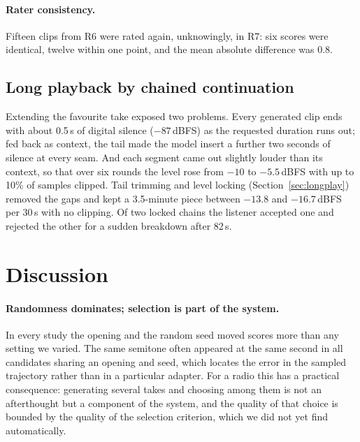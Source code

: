 \paragraph{Rater consistency.} Fifteen clips from R6 were rated again, unknowingly, in R7: six scores were identical,
twelve within one point, and the mean absolute difference was 0.8.

\subsection{Long playback by chained continuation}\label{sec:chain}
Extending the favourite take exposed two problems. Every generated clip ends with about 0.5\,s of digital silence
($-87$\,dBFS) as the requested duration runs out; fed back as context, the tail made the model insert a further two
seconds of silence at every seam. And each segment came out slightly louder than its context, so that over six
rounds the level rose from $-10$ to $-5.5$\,dBFS with up to 10\% of samples clipped. Tail trimming and level locking
(Section~\ref{sec:longplay}) removed the gaps and kept a 3.5-minute piece between $-13.8$ and $-16.7$\,dBFS per 30\,s
with no clipping. Of two locked chains the listener accepted one and rejected the other for a sudden breakdown after
82\,s.

\section{Discussion}\label{sec:discussion}

\paragraph{Randomness dominates; selection is part of the system.} In every study the opening and the random seed
moved scores more than any setting we varied. The same semitone often appeared at the same second in all candidates
sharing an opening and seed, which locates the error in the sampled trajectory rather than in a particular adapter.
For a radio this has a practical consequence: generating several takes and choosing among them is not an
afterthought but a component of the system, and the quality of that choice is bounded by the quality of the
selection criterion, which we did not yet find automatically.

